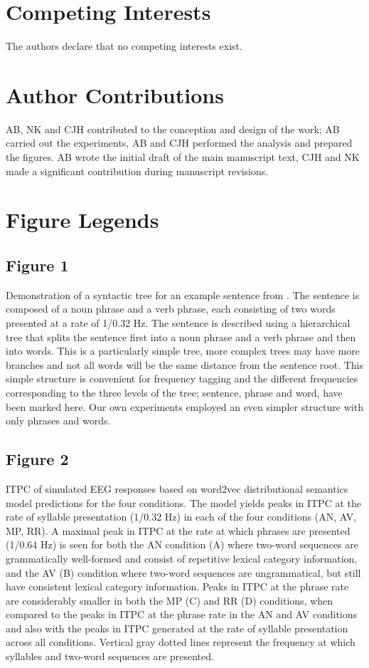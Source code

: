 \documentclass[10pt,letterpaper]{article}
\begin{document}
\section*{Competing Interests}
The authors declare that no competing interests exist.



\section*{Author Contributions}
AB, NK and CJH contributed to the conception and design of the work;
AB carried out the experiments, AB and CJH performed the analysis and
prepared the figures. AB wrote the initial draft of the main
manuscript text, CJH and NK made a significant contribution during
manuscript revisions.

\section*{Figure Legends}

\subsection*{Figure 1}

Demonstration of a syntactic tree for an example sentence from \cite{DingEtAl2016, DingEtAl2017}. The sentence is composed of a noun phrase and a verb phrase, each consisting of two words presented at a rate of 1/0.32 Hz.  The sentence is described using a hierarchical tree that splits the sentence first into a noun phrase and a verb phrase and then into words. This is a particularly simple tree, more complex trees may have more branches and not all words will be the same distance from the sentence root. This simple structure is convenient for frequency tagging and the different frequencies corresponding to the three levels of the tree; sentence, phrase and word, have been marked here. Our own experiments employed an even simpler structure with only phrases and words.

\subsection*{Figure 2}
ITPC of simulated EEG responses based on word2vec distributional semantics model predictions for the four conditions. The model yields peaks in ITPC at the rate of syllable presentation (1/0.32 Hz) in each of the four conditions (AN, AV, MP, RR). A maximal peak in ITPC at the rate at which phrases are presented (1/0.64 Hz) is seen for both the AN condition (A) where two-word sequences are grammatically well-formed and consist of repetitive lexical category information, and the AV (B) condition where two-word sequences are ungrammatical, but still have consistent lexical category information. Peaks in ITPC at the phrase rate are considerably smaller in both the MP (C) and RR (D) conditions, when compared to the peaks in ITPC at the phrase rate in the AN and AV conditions and also with the peaks in ITPC generated at the rate of syllable presentation across all conditions. Vertical gray dotted lines represent the frequency at which syllables and two-word sequences are presented.
\end{document}
